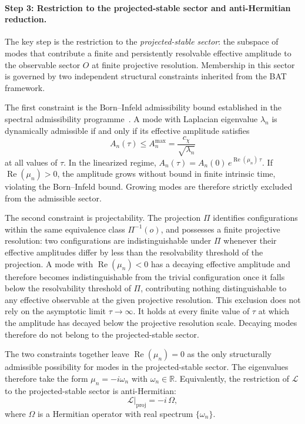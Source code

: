   \paragraph{Step 3: Restriction to the projected-stable sector and anti-Hermitian reduction.}

    The key step is the restriction to the \emph{projected-stable sector}: the subspace of modes
    that contribute a finite and persistently resolvable effective amplitude to the observable
    sector $O$ at finite projective resolution.
    Membership in this sector is governed by two independent structural constraints inherited
    from the BAT framework.

    The first constraint is the Born--Infeld admissibility bound established in the spectral
    admissibility programme~\cite{Beau2026a1}.
    A mode with Laplacian eigenvalue $\lambda_n$ is dynamically admissible if and only if its
    effective amplitude satisfies
    \[
      A_n(\tau) \leq A_n^{\max} = \frac{c_\chi}{\sqrt{\lambda_n}}
    \]
    at all values of $\tau$.
    In the linearized regime, $A_n(\tau) = A_n(0)\,e^{\operatorname{Re}(\mu_n)\,\tau}$.
    If $\operatorname{Re}(\mu_n) > 0$, the amplitude grows without bound in finite intrinsic time,
    violating the Born--Infeld bound.
    Growing modes are therefore strictly excluded from the admissible sector.

    The second constraint is projectability.
    The projection $\Pi$ identifies configurations within the same equivalence class
    $\Pi^{-1}(o)$, and possesses a finite projective resolution: two configurations are
    indistinguishable under $\Pi$ whenever their effective amplitudes differ by less than the
    resolvability threshold of the projection.
    A mode with $\operatorname{Re}(\mu_n) < 0$ has a decaying effective amplitude and therefore
    becomes indistinguishable from the trivial configuration once it falls below the resolvability
    threshold of $\Pi$, contributing nothing distinguishable to any effective observable at the
    given projective resolution.
    This exclusion does not rely on the asymptotic limit $\tau \to \infty$.
    It holds at every finite value of $\tau$ at which the amplitude has decayed below the
    projective resolution scale.
    Decaying modes therefore do not belong to the projected-stable sector.

    The two constraints together leave $\operatorname{Re}(\mu_n) = 0$ as the only structurally
    admissible possibility for modes in the projected-stable sector.
    The eigenvalues therefore take the form $\mu_n = -i\omega_n$ with $\omega_n \in \mathbb{R}$.
    Equivalently, the restriction of $\mathcal{L}$ to the projected-stable sector is anti-Hermitian:
    \[
      \mathcal{L}\big|_{\mathrm{proj}} = -i\,\Omega,
    \]
    where $\Omega$ is a Hermitian operator with real spectrum $\{\omega_n\}$.

